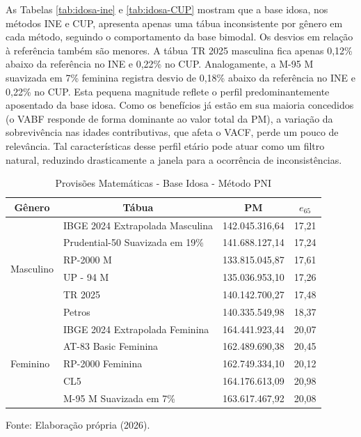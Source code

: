 \vspace{0.5cm}
As Tabelas \ref{tab:idosa-ine} e \ref{tab:idosa-CUP} mostram que a base idosa, nos métodos INE e CUP, apresenta apenas uma tábua inconsistente por gênero em cada método, seguindo o comportamento da base bimodal. Os desvios em relação à referência também são menores. A tábua TR 2025 masculina fica apenas 0,12\% abaixo da referência no INE e 0,22\% no CUP. Analogamente, a M-95 M suavizada em 7\% feminina registra desvio de 0,18\% abaixo da referência no INE e 0,22\% no CUP. Esta pequena magnitude reflete o perfil predominantemente aposentado da base idosa. Como os benefícios já estão em sua maioria concedidos (o VABF responde de forma dominante ao valor total da PM), a variação da sobrevivência nas idades contributivas, que afeta o VACF, perde um pouco de relevância. Tal características desse perfil etário pode atuar como um filtro natural, reduzindo drasticamente a janela para a ocorrência de inconsistências.
\vspace{0.25cm}
\begin{table}[htbp]
    \centering
    \caption{Provisões Matemáticas - Base Idosa - Método PNI}
    \begin{threeparttable}
    \renewcommand{\arraystretch}{1.2}
    \begin{tabular}{llrr}
    \toprule
    \multicolumn{1}{c}{\textbf{Gênero}} & \multicolumn{1}{c}{\textbf{Tábua}} & \multicolumn{1}{c}{\textbf{PM}} & \multicolumn{1}{c}{\textbf{$e_{65}$}} \\ \midrule
    \multirow{6}{*}{Masculino} & IBGE 2024 Extrapolada Masculina & 142.045.316,64 & 17,21 \\
                                & Prudential-50 Suavizada em 19\% & 141.688.127,14 & 17,24 \\
                                & RP-2000 M & 133.815.045,87 & 17,61 \\
                                & UP - 94 M & 135.036.953,10 & 17,26 \\
                                & TR 2025 & 140.142.700,27 & 17,48 \\
                                & Petros & 140.335.549,98 & 18,37 \\ \hline
    \multirow{5}{*}{Feminino} & IBGE 2024 Extrapolada Feminina & 164.441.923,44 & 20,07 \\
                                & AT-83 Basic Feminina & 162.489.690,38 & 20,45 \\
                                & RP-2000 Feminina & 162.749.334,10 & 20,12 \\
                                & CL5 & 164.176.613,09 & 20,98 \\
                                & M-95 M Suavizada em 7\% & 163.617.467,92 & 20,08 \\ \bottomrule
    \end{tabular}
    \begin{tablenotes}[flushleft]
        \small
        \item Fonte: Elaboração própria (2026).
    \end{tablenotes}
    \end{threeparttable}
    \label{tab:idosa-pni}
\end{table}

